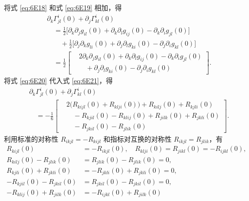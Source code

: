 \begin{enumerate}
将式 \eqref{eq:6E18} 和式 \eqref{eq:6E19} 相加，得
\begin{equation*}
\begin{aligned}
 &\partial_k\Gamma^i_{jl}(0)+\partial_j\Gamma^i_{kl}(0)\\
 &\quad=\frac12\bigl[\partial_k\partial_jg_{il}(0)+\partial_k\partial_lg_{ij}(0)
                       -\partial_k\partial_i g_{jl}(0)\bigr]\\
 &\qquad+\frac12\bigl[\partial_j\partial_k g_{li}(0)+\partial_j\partial_lg_{ki}(0)
                       -\partial_j\partial_i g_{kl}(0)\bigr]\\
 &\quad=\frac12\left[
   \begin{aligned}
     &2\partial_k\partial_jg_{il}(0)+\partial_k\partial_l g_{ij}(0)-\partial_k\partial_i g_{jl}(0)\\
     &\quad+\partial_j\partial_lg_{ki}(0)-\partial_j\partial_i g_{kl}(0)
   \end{aligned}\right].
\end{aligned}
\tag{6E21}\label{eq:6E21}
\end{equation*}
将式 \eqref{eq:6E20} 代入式 \eqref{eq:6E21}，得
\begin{equation*}
\begin{aligned}
 &\partial_k\Gamma^i_{jl}(0)+\partial_j\Gamma^i_{kl}(0)\\
 &\quad=-\frac16\left[
 \begin{aligned}
   &2\bigl(R_{kijl}(0)+R_{klji}(0)\bigr)+R_{kilj}(0)+R_{kjli}(0)\\
   &\quad-R_{kjil}(0)-R_{klij}(0)+R_{jilk}(0)+R_{jkli}(0)\\
   &\quad-R_{jkil}(0)-R_{jlik}(0)
 \end{aligned}
 \right].
\end{aligned}
\tag{6E22}\label{eq:6E22}
\end{equation*}
利用标准的对称性 $R_{ikjl}=-R_{kijl}$ 和指标对互换的对称性 $R_{ikjl}=R_{jlik}$，有
\begin{equation*}
\begin{aligned}
 R_{kijl}(0)&=-R_{ikjl}(0),\quad R_{klji}(0)=R_{jikl}(0)=-R_{ijkl}(0),\\
 R_{kilj}(0)-R_{jlik}(0)&=R_{jlik}(0)-R_{jlik}(0)=0,\\
 R_{kjli}(0)+R_{jkli}(0)&=-R_{jkli}(0)+R_{jkli}(0)=0,\\
 -R_{kjil}(0)-R_{jkil}(0)&=R_{jkil}(0)-R_{jkil}(0)=0,\\
 -R_{klij}(0)+R_{jilk}(0)&=-R_{ijkl}(0)+R_{jilk}(0)\\

\end{aligned}
\end{equation*}
\end{enumerate}
